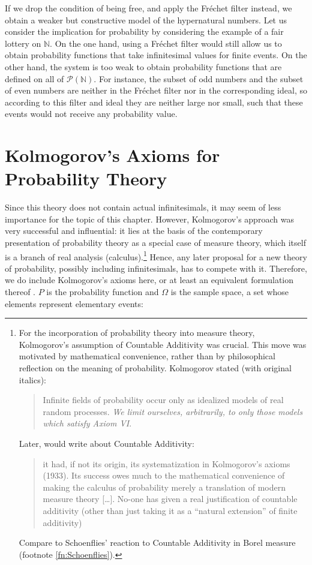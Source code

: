If we drop the condition of being free, and apply the Fr\'{e}chet filter instead, we obtain a weaker but constructive model of the hypernatural numbers.
Let us consider the implication for probability by considering the example of a fair lottery on $\mathbb{N}$. On the one hand, using a Fr\'{e}chet filter would still allow us to obtain probability functions that take infinitesimal values for finite events. On the other hand, the system is too weak to obtain probability functions that are defined on all of $\mathcal{P}(\mathbb{N})$. For instance, the subset of odd numbers and the subset of even numbers are neither in the Fr\'{e}chet filter nor in the corresponding ideal, so according to this filter and ideal they are neither large nor small, such that these events would not receive any probability value.

\section{Kolmogorov's Axioms for Probability Theory}\label{sec:KolmAxioms}
Since this theory does not contain actual infinitesimals, it may seem of less importance for the topic of this chapter. However, Kolmogorov's approach was very successful and influential: it lies at the basis of the contemporary presentation of probability theory as a special case of measure theory, which itself is a branch of real analysis (calculus).\footnote{For the incorporation of probability theory into measure theory, Kolmogorov's assumption of Countable Additivity was crucial. This move was motivated by mathematical convenience, rather than by philosophical reflection on the meaning of probability. Kolmogorov stated (with original italics):
\begin{quote}
Infinite fields of probability occur only as idealized models of real random processes. \emph{We limit ourselves, arbitrarily, to only those models which satisfy Axiom VI}. \citep[p.~15]{Kolmogorov:1933}
\end{quote}
Later, \citet[Vol.~I, p.~119]{deFinetti:1974} would write about Countable Additivity:
\begin{quote}
it had, if not its origin, its systematization in Kolmogorov's axioms (1933). Its success owes much to the mathematical convenience of making the calculus of probability merely a translation of modern measure theory [\ldots]. No-one has given a real justification of countable additivity (other than just taking it as a ``natural extension'' of finite additivity)
\end{quote}
Compare to Schoenflies' reaction to Countable Additivity in Borel measure (footnote \ref{fn:Schoenflies}).
} Hence, any later proposal for a new theory of probability, possibly including infinitesimals, has to compete with it. Therefore, we do include Kolmogorov's axioms here, or at least an equivalent formulation thereof \citep[taken from][]{Benci_etal:2013}. $P$ is the probability function and $\Omega$ is the sample space, a set whose elements represent elementary events:

